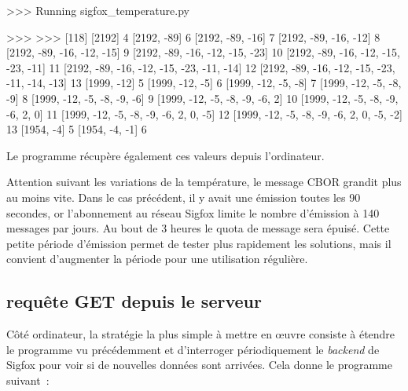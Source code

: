 \begin{termc}[backgroundcolor=\color{gray!10}, basicstyle=\ttfamily\tiny, escapechar=@]
>>> Running sigfox_temperature.py

>>>
>>>
[118]
[2192] 4
[2192, -89] 6
[2192, -89, -16] 7
[2192, -89, -16, -12] 8
[2192, -89, -16, -12, -15] 9
[2192, -89, -16, -12, -15, -23] 10
[2192, -89, -16, -12, -15, -23, -11] 11
[2192, -89, -16, -12, -15, -23, -11, -14] 12
[2192, -89, -16, -12, -15, -23, -11, -14, -13] 13
[1999, -12] 5
[1999, -12, -5] 6
[1999, -12, -5, -8] 7
[1999, -12, -5, -8, -9] 8
[1999, -12, -5, -8, -9, -6] 9
[1999, -12, -5, -8, -9, -6, 2] 10
[1999, -12, -5, -8, -9, -6, 2, 0] 11
[1999, -12, -5, -8, -9, -6, 2, 0, -5] 12
[1999, -12, -5, -8, -9, -6, 2, 0, -5, -2] 13
[1954, -4] 5
[1954, -4, -1] 6
\end{termc}

Le  programme  récupère également ces valeurs depuis l'ordinateur.


Attention suivant les variations de la température, le message CBOR grandit plus au moins vite. Dans le cas précédent, il y avait une émission toutes les 90 secondes, or l'abonnement au réseau Sigfox limite le nombre d'émission à 140 messages par jours. Au bout de 3 heures le quota de message sera épuisé. Cette petite période d'émission permet de tester plus rapidement les solutions, mais il convient d'augmenter la période pour une utilisation régulière.

\subsection{requête GET depuis le serveur}\label{chap-sigfox-GET}

Côté ordinateur, la stratégie la plus simple à mettre en œuvre consiste à étendre le programme  vu précédemment et d'interroger périodiquement le \textit{backend} de Sigfox pour voir si de nouvelles données sont arrivées. Cela donne le programme  suivant~:

